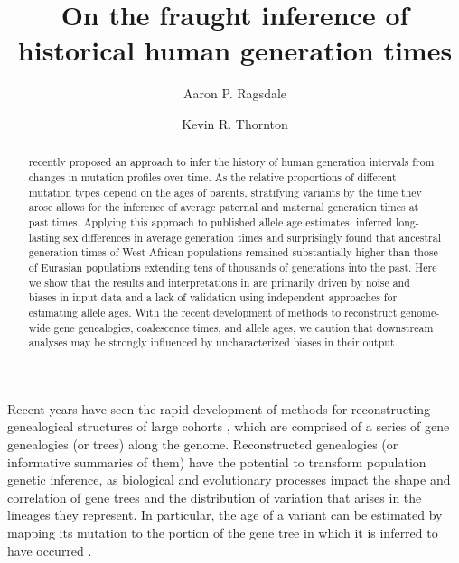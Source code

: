 \documentclass[]{article}
\title{On the fraught inference of historical human generation times}
\author[1,*]{Aaron P. Ragsdale}
\author[2]{Kevin R. Thornton}
\affil[1]{University of Wisconsin--Madison, Wisconsin, USA}
\affil[2]{University of California, Irvine, California, USA}
\affil[*]{apragsdale@wisc.edu}
\begin{document}
\maketitle

\begin{abstract}

    \noindent \citet{wang2023human} recently proposed an approach to infer the
    history of human generation intervals from changes in mutation profiles
    over time. As the relative proportions of different mutation types depend
    on the ages of parents, stratifying variants by the time they arose allows
    for the inference of average paternal and maternal generation times at past
    times. Applying this approach to published allele age estimates,
    \citet{wang2023human} inferred long-lasting sex differences in average
    generation times and surprisingly found that ancestral generation times of
    West African populations remained substantially higher than those of
    Eurasian populations extending tens of thousands of generations into the
    past. Here we show that the results and interpretations in
    \citet{wang2023human} are primarily driven by noise and biases in input
    data and a lack of validation using independent approaches for estimating
    allele ages. With the recent development of methods to reconstruct
    genome-wide gene genealogies, coalescence times, and allele ages, we
    caution that downstream analyses may be strongly influenced by
    uncharacterized biases in their output.

\end{abstract}

Recent years have seen the rapid development of methods for reconstructing
genealogical structures of large cohorts
\citep{speidel2019method,wohns2022unified,hubisz2020mapping}, which are
comprised of a series of gene genealogies (or trees) along the genome.
Reconstructed genealogies (or informative summaries of them) have the potential
to transform population genetic inference, as biological and evolutionary
processes impact the shape and correlation of gene trees and the distribution
of variation that arises in the lineages they represent. In particular, the age
of a variant can be estimated by mapping its mutation to the portion of the
gene tree in which it is inferred to have occurred \citep{albers2020dating}.
\end{document}
